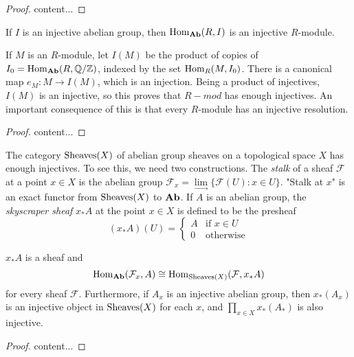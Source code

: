 \begin{proof}
	content...
\end{proof}

\begin{corollary}
	If $I$ is an injective abelian group, then $\operatorname{Hom}_{\textrm{\textup{\textbf{Ab}}}}(R,I)$ is an injective $R$-module.
\end{corollary}

\begin{exercise}
	If $M$ is an $R$-module, let $I(M)$ be the product of copies of $I_0=\operatorname{Hom}_{\textrm{\textup{\textbf{Ab}}}}(R,{\mathbb Q}/{\mathbb Z})$, indexed by the set $\operatorname{Hom}_R(M,I_0)$.
	There is a canonical map $e_M:M\rightarrow I(M)$, which is an injection.
	Being a product of injectives, $I(M)$ is an injective, so this proves that $R-mod$ has enough injectives.
	An important consequence of this is that every $R$-module has an injective resolution.
\end{exercise}

\begin{proof}
	content...
\end{proof}

\begin{example}
	The category $\operatorname{Sheaves}(X)$ of abelian group sheaves on a topological space $X$ has enough injectives.
	To see this, we need two constructions.
	The \textit{stalk} of a sheaf $\mathcal{F}$ at a point $x\in X$ is the abelian group $\mathcal{F}_x = \underset{\longrightarrow}{\lim}\{\mathcal{F}(U):x\in U\}$.
	"Stalk at $x$" is an exact functor from $\operatorname{Sheaves}(X)$ to $\textrm{\textup{\textbf{Ab}}}$.
	If $A$ is an abelian group, the \textit{skyscraper sheaf} $x_*A$ at the point $x\in X$ is defined to be the presheaf
	$$(x_*A)(U)=\left\{\begin{array}{ll}A & \text{if }x\in U \\ 0 & \text{otherwise}\end{array}\right.$$
\end{example}

\begin{exercise}
	$x_*A$ is a sheaf and 
	$$\operatorname{Hom}_{\textrm{\textup{\textbf{Ab}}}}(\mathcal{F}_x,A) \cong \operatorname{Hom}_{\operatorname{Sheaves}(X)}(\mathcal{F},x_*A)$$
	for every sheaf $\mathcal{F}$.
	Furthermore, if $A_x$ is an injective abelian group, then $x_*(A_x)$ is an injective object in $\operatorname{Sheaves}(X)$ for each $x$, and $\prod_{x\in X} x_*(A_*)$ is also injective.
\end{exercise}

\begin{proof}
	content...
\end{proof}

